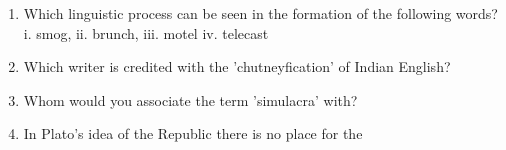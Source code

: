 \documentclass[12pt]{article}
\theoremstyle{remark}
\begin{document}
\begin{enumerate}
\begin{enumerate}
 \end{enumerate}
\hfill{}
\item Which linguistic process can be seen in the formation of the following words?
i. smog, ii. brunch, iii. motel iv. telecast 
\begin{enumerate}  \end{enumerate}
\hfill{}
\item Which writer is credited with the 'chutneyfication' of Indian English? 
\begin{enumerate}  \end{enumerate}
\hfill{}
\item Whom would you associate the term 'simulacra' with? 
\begin{enumerate}  \end{enumerate}
\hfill{}
\item In Plato's idea of the Republic there is no place for the 
\begin{enumerate} 
\end{enumerate}
\end{enumerate}
\end{document}
